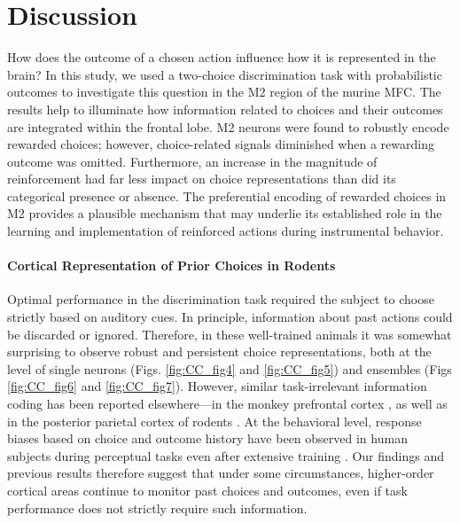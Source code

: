 
\section{Discussion}
How does the outcome of a chosen action influence how it is represented in the brain? In this study, we used a two-choice discrimination task with probabilistic outcomes to investigate this question in the M2 region of the murine MFC. The results help to illuminate how information related to choices and their outcomes are integrated within the frontal lobe. M2 neurons were found to robustly encode rewarded choices; however, choice-related signals diminished when a rewarding outcome was omitted. Furthermore, an increase in the magnitude of reinforcement had far less impact on choice representations than did its categorical presence or absence. The preferential encoding of rewarded choices in M2 provides a plausible mechanism that may underlie its established role in the learning and implementation of reinforced actions during instrumental behavior.

\paragraph{Cortical Representation of Prior Choices in Rodents}
Optimal performance in the discrimination task required the subject to choose strictly based on auditory cues. In principle, information about past actions could be discarded or ignored. Therefore, in these well-trained animals it was somewhat surprising to observe robust and persistent choice representations, both at the level of single neurons (Figs. \ref{fig:CC_fig4} and \ref{fig:CC_fig5}) and ensembles (Figs \ref{fig:CC_fig6} and \ref{fig:CC_fig7}). However, similar task-irrelevant information coding has been reported elsewhere—in the monkey prefrontal cortex \citep{genovesio2014autonomous}, as well as in the posterior parietal cortex of rodents \citep{morcos2016history}. At the behavioral level, response biases based on choice and outcome history have been observed in human subjects during perceptual tasks even after extensive training \citep{frund2014quantifying, abrahamyan2016adaptable}. Our findings and previous results therefore suggest that under some circumstances, higher-order cortical areas continue to monitor past choices and outcomes, even if task performance does not strictly require such information.

